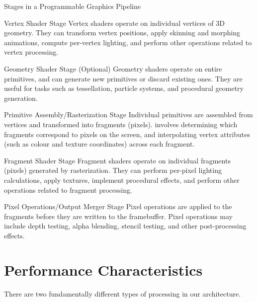 \documentclass[../COS3712_Notes.tex]{subfiles}
\begin{document}
      \begin{sidenote}{Stages in a Programmable Graphics Pipeline}
        $ $\vspace{-1em}
        \begin{descriptenum}[nosep]
          \item[Vertex Shader Stage] Vertex shaders operate on individual vertices of
            3D geometry.
            They can transform vertex positions, apply skinning and morphing animations,
            compute per-vertex lighting, and perform other operations related to vertex
            processing.
          \item[Geometry Shader Stage (Optional)] Geometry shaders operate on entire primitives,
            and can generate new primitives or discard existing ones.
            They are useful for tasks such as tessellation, particle systems,
            and procedural geometry generation.
          \item[Primitive Assembly/Rasterization Stage] Individual primitives are assembled
            from vertices and transformed into fragments (pixels).
             involves determining which fragments correspond to pixels
            on the screen, and interpolating vertex attributes
            (such as colour and texture coordinates) across each fragment.
          \item[Fragment Shader Stage] Fragment shaders operate on individual fragments (pixels)
            generated by rasterization.
            They can perform per-pixel lighting calculations, apply textures, implement
            procedural effects, and perform other operations related to fragment processing.
          \item[Pixel Operations/Output Merger Stage] Pixel operations are applied to the
            fragments before they are written to the framebuffer.
            Pixel operations may include depth testing, alpha blending, stencil testing,
            and other post-processing effects.
        \end{descriptenum}
      \end{sidenote}

    \section{Performance Characteristics}
      There are two fundamentally different types of processing in our architecture.
\end{document}
